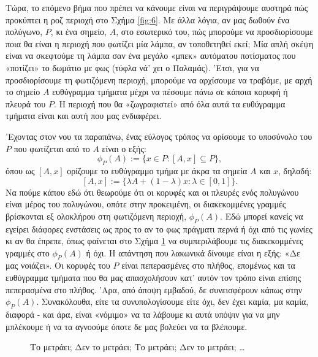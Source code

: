 \documentclass[11pt,a4paper]{article}
\theoremstyle{definition}
\begin{document}
	Τώρα, το επόμενο βήμα που πρέπει να κάνουμε είναι να περιγράψουμε αυστηρά πώς προκύπτει η ροζ περιοχή στο Σχήμα \ref{fig:6}. Με άλλα λόγια, αν μας δωθούν ένα πολύγωνο, $P$, κι ένα σημείο, $A$, στο εσωτερικό του, πώς μπορούμε να προσδιορίσουμε ποια θα είναι η περιοχή που φωτίζει μία λάμπα, αν τοποθετηθεί εκεί; Μία απλή σκέψη είναι να σκεφτούμε τη λάμπα σαν ένα μεγάλο «μπεκ» αυτόματου ποτίσματος που «ποτίζει» το δωμάτιο με φως (τύφλα νά' χει ο Παλαμάς). 'Ετσι, για να προσδιορίσουμε τη φωτιζόμενη περιοχή, μπορούμε να αρχίσουμε να τραβάμε, με αρχή το σημείο $A$ ευθύγραμμα τμήματα μέχρι να πέσουμε πάνω σε κάποια κορυφή ή πλευρά του $P$. Η περιοχή που θα «ζωγραφιστεί» από όλα αυτά τα ευθύγραμμα τμήματα είναι και αυτή που μας ενδιαφέρει.
	
	'Εχοντας στον νου τα παραπάνω, ένας εύλογος τρόπος να ορίσουμε το υποσύνολο του $P$ που φωτίζεται από το $A$ είναι ο εξής:
	\begin{equation}\label{eq:light_pa}
	\phi_P(A):=\{x\in P:[A,x]\subseteq P\},
	\end{equation}
	όπου ως $[A,x]$ ορίζουμε το ευθύγραμμο τμήμα με άκρα τα σημεία $A$ και $x$, δηλαδή:
	\begin{equation}\label{eq:segment}
	[A,x]:=\{\lambda A+(1-\lambda)x:\lambda\in[0,1]\}.
	\end{equation}
	Να πούμε κάπου εδώ ότι θεωρούμε ότι οι κορυφές και οι πλευρές ενός πολυγώνου είναι μέρος του πολυγώνου, οπότε στην προκειμένη, οι διακεκομμένες γραμμές βρίσκονται εξ ολοκλήρου στη φωτιζόμενη περιοχή, $\phi_P(A)$. Εδώ μπορεί κανείς να εγείρει διάφορες ενστάσεις ως προς το αν το φως πράγματι περνά ή όχι από τις γωνίες κι αν θα έπρεπε, όπως φαίνεται στο Σχήμα \ref{fig:7} να συμπεριλάβουμε τις διακεκομμένες γραμμές στο $\phi_P(A)$ ή όχι. Η απάντηση που λακωνικά δίνουμε είναι η εξής: «Δε μας νοιάζει». Οι κορυφές του $P$ είναι πεπερασμένες στο πλήθος, επομένως και τα ευθύγραμμα τμήματα που θα μας απασχολήσουν κατ' αυτόν τον τρόπο είναι επίσης πεπερασμένα στο πλήθος. 'Αρα, από άποψη εμβαδού, δε συνεισφέρουν κάπως στην $\phi_P(A)$. Συνακόλουθα, είτε τα συνυπολογίσουμε είτε όχι, δεν έχει καμία, μα καμία, διαφορά - και άρα, είναι «νόμιμο» να τα λάβουμε κι αυτά υπόψιν για να μην μπλέκουμε ή να τα αγνοούμε όποτε δε μας βολεύει να τα βλέπουμε.
	
	\begin{figure}[!htb]
		\centering
		\caption{Το μετράει; Δεν το μετράει; Το μετράει; Δεν το μετράει; \ldots}
		\label{fig:7}
	\end{figure}
\end{document}
